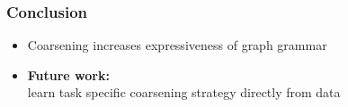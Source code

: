 \documentclass{beamer}
\begin{document}
\begin{frame}
    \frametitle{Conclusion}
    
    \begin{itemize}
        \item Coarsening increases expressiveness of graph grammar  
        \item {\bf Future work:} \\learn task specific coarsening strategy directly from data   
    \end{itemize}

\end{frame}
\end{document}
